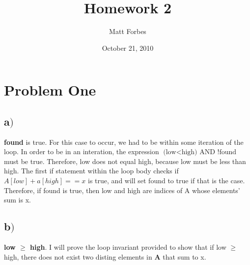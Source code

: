 \documentclass[a4paper,12pt]{article}
\begin{document}
\title{Homework 2}
\author{Matt Forbes}
\date{October 21, 2010}
\maketitle

\newenvironment{indentpar}[1]%
{\begin{list}{}%
         {\setlength{\leftmargin}{#1}}%
         \item[]%
}
{\end{list}}

\section{Problem One}
\subsection*{a\()\)} {\bf found} is true. For this case to occur, we
had to be within some iteration of the loop. In order to be in an
interation, the expression \(\text{(low} < \text{high) AND !found}\)
must be true. Therefore, low does not equal high, because low must be
less than high. The first if statement within the loop body checks if
\(A[low] + a[high] == x\) is true, and will set found to true if that
is the case. Therefore, if found is true, then low and high are
indices of A whose elements' sum is x.
\subsection*{b\()\)}

{\bf low \(\ge\) high}. I will prove the loop invariant provided to
show that if low \(\ge\) high,
there does not exist two disting elements in {\bf A} that sum to x.\\
\end{document}
